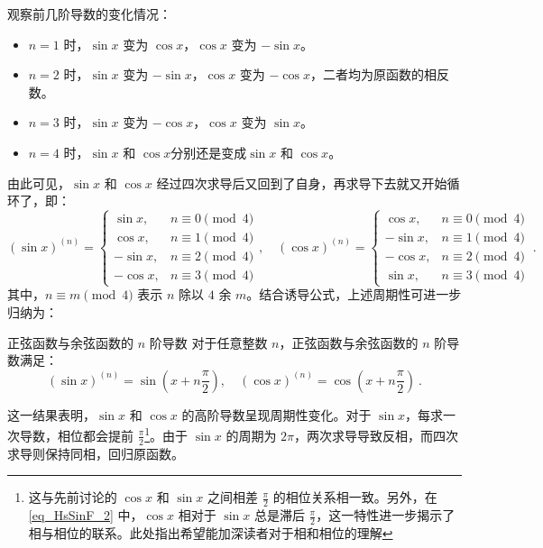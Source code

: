 观察前几阶导数的变化情况：
\begin{itemize}
\item $n = 1$ 时，$\sin x$ 变为 $\cos x$，$\cos x$ 变为 $-\sin x$。
\item $n = 2$ 时，$\sin x$ 变为 $-\sin x$，$\cos x$ 变为 $-\cos x$，二者均为原函数的相反数。
\item $n = 3$ 时，$\sin x$ 变为 $-\cos x$，$\cos x$ 变为 $\sin x$。
\item $n = 4$ 时，$\sin x$ 和 $\cos x$分别还是变成$\sin x$ 和 $\cos x$。
\end{itemize}
由此可见，$\sin x$ 和 $\cos x$ 经过四次求导后又回到了自身，再求导下去就又开始循环了，即：
\begin{equation}\label{eq_HsSinF_2}
(\sin x)^{(n)}  =
\begin{cases}
\sin x, & n \equiv 0 \pmod{4} \\
\cos x, & n \equiv 1 \pmod{4} \\
-\sin x, & n \equiv 2 \pmod{4} \\
-\cos x, & n \equiv 3 \pmod{4}
\end{cases},\quad(\cos x)^{(n)} =
\begin{cases}
\cos x, & n \equiv 0 \pmod{4} \\
-\sin x, & n \equiv 1 \pmod{4} \\
-\cos x, & n \equiv 2 \pmod{4} \\
\sin x, & n \equiv 3 \pmod{4}
\end{cases}~.
\end{equation}
其中，$n \equiv m \pmod{4}$ 表示 $n$ 除以 $4$ 余 $m$。结合诱导公式，上述周期性可进一步归纳为：

\begin{corollary}{正弦函数与余弦函数的 $n$ 阶导数}
对于任意整数 $n$，正弦函数与余弦函数的 $n$ 阶导数满足：
\begin{equation}
(\sin x)^{(n)} = \sin\left(x + n\frac{\pi}{2}\right), \quad
(\cos x)^{(n)} = \cos\left(x + n\frac{\pi}{2}\right)~.
\end{equation}
\end{corollary}

这一结果表明，$\sin x$ 和 $\cos x$ 的高阶导数呈现周期性变化。对于 $\sin x$，每求一次导数，相位都会提前 $\displaystyle\frac{\pi}{2}$\footnote{这与先前讨论的 $\cos x$ 和 $\sin x$ 之间相差 $\displaystyle\frac{\pi}{2}$ 的相位关系相一致。另外，在 \autoref{eq_HsSinF_2} 中，$\cos x$ 相对于 $\sin x$ 总是滞后 $\frac{\pi}{2}$，这一特性进一步揭示了相与相位的联系。此处指出希望能加深读者对于相和相位的理解}。由于 $\sin x$ 的周期为 $2\pi$，两次求导导致反相，而四次求导则保持同相，回归原函数。

